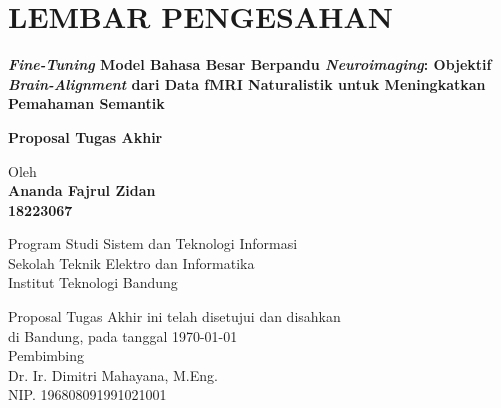 \chapter*{LEMBAR PENGESAHAN}


\begin{center}
    \vspace{2cm}
  {\large\bfseries \textit{Fine-Tuning} Model Bahasa Besar Berpandu \textit{Neuroimaging}: Objektif \textit{Brain-Alignment} dari Data fMRI Naturalistik untuk Meningkatkan Pemahaman Semantik}\\
     \vspace{2cm}

  {\Large \textbf{Proposal Tugas Akhir}}\\


  \vspace{1.5cm}
    
    
  {\large Oleh}\\[0.3cm]
    \textbf{
    {\large Ananda Fajrul Zidan}\\
    {\large 18223067}
  }\\
    
  \vspace{0.5cm}
 
  {\large Program Studi Sistem dan Teknologi Informasi}\\
  {\large Sekolah Teknik Elektro dan Informatika}\\
  {\large Institut Teknologi Bandung}\\

  \vspace{1.5cm}

  Proposal Tugas Akhir ini telah disetujui dan disahkan\\ 
  di Bandung, pada tanggal \today\\[1cm]

	Pembimbing  \\[3cm]
	Dr. Ir. Dimitri Mahayana, M.Eng.   \\[0.2cm]
	NIP. 196808091991021001

\end{center}

\vspace{1cm}
\noindent



